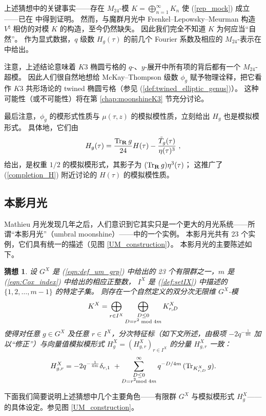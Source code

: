\documentclass[11pt,a4paper,fontset=windows]{ctexart}
\newtheorem{conj}[thm]{猜想}
\numberwithin{equation}{section}
\newcommand{\xmod}{{\rm \;mod\;}}
\def\d{\delta}
\def\inf{\infty}
\def\t{\tau}
\def\til{\tilde}
\newcommand{\tr}{\operatorname{Tr}}
\newcommand{\be}{\begin{equation}}
\newcommand{\ee}{\end{equation}}
\newcommand{\eq}[1]{(\ref{#1})}
\begin{document}
上述猜想中的关键事实——存在 $M_{24}$-模 $K=\bigoplus_{n=1}^\inf K_n $ 使 \eq{rep_mock} 成立——已在 \cite{gannon2016much} 中得到证明。
然而，与魔群月光中 Frenkel--Lepowsky--Meurman 构造 $V^\natural$ 相仿的对模 $K$ 的构造，至今仍然缺失。
因此我们完全不知道 $K$ 为何应当“自然”。
作为显式数据，$q$ 级数 $H_g(\t)$ 的前几个 Fourier 系数及相应的 $M_{24}$-表示在 \cite{cheng2011largest} 中给出。

注意，上述结论意味着 $K3$ 椭圆亏格的 $q$-、$y$-展开中所有项的背后都有一个 $M_{24}$-超模。
因此人们很自然地想给 McKay--Thompson 级数 $\phi_g$ 赋予物理诠释，把它看作 $K3$ 共形场论的 twined 椭圆亏格（参见 \eq{def:twined_elliptic_genus}）。
这种可能性（或不可能性）将在第 \ref{chap:moonshineK3} 节充分讨论。



最后注意，$\phi_g$ 的模形式性质与 $\mu(\t,z)$ 的模拟模性质，立刻给出 $H_g$ 也是模拟模形式。
具体地，它们由
\be\label{h_g_explicit}
H_g(\t) = \frac{\tr_{\bf R} {g } }{24} H(\t) - \frac{\til T_g(\t)}{\eta(\t)^3}~,
\ee
给出，是权重 $1/2$ 的模拟模形式，其影子为 $(\tr_{\bf R} {g } )\eta^3(\t)$；
这推广了 (\ref{completion_H}) 附近讨论的 $H(\t)$ 的模拟模性质。

\subsection{本影月光}
\label{sec:umbral}

Mathieu 月光发现几年之后，人们意识到它其实只是一个更大的月光系统——所谓“本影月光”（umbral moonshine）\cite{UM,cheng2014umbral}——中的一个实例。
本影月光共有 23 个实例，它们具有统一的描述（见图 \ref{UM_construction}）。
本影月光的主要陈述如下。

\begin{conj}\label{conj:mock_umbral}
设 $G^X$ 是 (\ref{eqn:def_um_grp}) 中给出的 23 个有限群之一，$m$ 是 \eq{eqn:Cox_index} 中给出的相应正整数，
$I^X$ 是 \eq{def:setIX} 中描述的 $\{1,2,\dots,m-1\}$ 的特定子集。
则存在一个自然定义的双分次无限维 $G^X$-模 $$K^X=\bigoplus_{r\in I^X} \bigoplus_{\substack{D\leq 0\\ D=r^2\xmod{4m}}}  K_{r,D}^X$$
使得对任意 $g\in G^X$ 及任意 $r\in I^X$，分次特征标（如下文所述，由极项 $ -2 q^{-\frac{1}{4m}}$ 加以“修正”）与向量值模拟模形式 $H^X_g = (H^X_{g,r})_{r\in I^X}$ 的分量 $H^X_{g,r}$ 一致：
\be\label{rep_mock_umbral}
H^X_{g,r} = -2 q^{-\frac{1}{4m}} \d_{r,1} \  + \sum_{\substack{D\leq 0\\ D=r^2\!\!\xmod{4m}}}^\inf q^{-D/4m}\,(\tr_{K_{r,D}^X} g). 
\ee
\end{conj}
下面我们简要说明上述猜想中几个主要角色——有限群 $G^X$ 与模拟模形式 $H^X_g$——的具体设定。参见图 \ref{UM_construction}。
\end{document}
